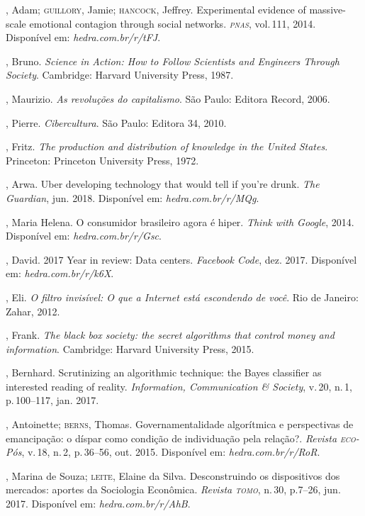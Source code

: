 \begin{bibliohedra}
, Adam; \textsc{guillory}, Jamie; \textsc{hancock}, Jeffrey. Experimental evidence of massive-scale emotional contagion through social networks. \textit{\textsc{pnas}}, vol.\,111, 2014. Disponível em: \textit{hedra.com.br/r/tFJ}.

, Bruno. \textit{Science in Action: How to Follow Scientists and
Engineers Through Society}. Cambridge: Harvard University Press, 1987.

, Maurizio. \textit{As revoluções do capitalismo}. São Paulo: Editora
Record, 2006.

, Pierre. \textit{Cibercultura}. São Paulo: Editora 34, 2010.

, Fritz. \textit{The production and distribution of knowledge in the
United States}. Princeton: Princeton University Press, 1972.

, Arwa. Uber developing technology that would tell if you're
drunk. \textit{The Guardian}, jun. 2018. Disponível em: \textit{hedra.com.br/r/MQg}.

, Maria Helena. O consumidor brasileiro agora é hiper. \textit{Think
with Google}, 2014. Disponível em: \textit{hedra.com.br/r/Gsc}.

, David. 2017 Year in review: Data centers. \textit{Facebook Code},
dez. 2017. Disponível em: \textit{hedra.com.br/r/k6X}.

, Eli. \textit{O filtro invisível: O que a Internet está escondendo
de você}. Rio de Janeiro: Zahar, 2012.

, Frank. \textit{The black box society: the secret algorithms that
control money and information}. Cambridge: Harvard University Press, 2015.

, Bernhard. Scrutinizing an algorithmic technique: the Bayes
classifier as interested reading of reality. \textit{Information, Communication
\& Society}, v.\,20, n.\,1, p.\,100--117, jan. 2017.

, Antoinette; \textsc{berns}, Thomas. Governamentalidade
algorítmica e perspectivas de emancipação: o díspar como condição de
individuação pela relação?. \textit{Revista \textsc{eco}-Pós}, v.\,18, n.\,2, p.\,36--56, out. 2015. Disponível em: \textit{hedra.com.br/r/RoR}.

, Marina de Souza; \textsc{leite}, Elaine da Silva. Desconstruindo os
dispositivos dos mercados: aportes da Sociologia Econômica. \textit{Revista
\textsc{tomo}}, n.\,30, p.7--26, jun. 2017. Disponível em: \textit{hedra.com.br/r/AhB}.


\end{bibliohedra}
